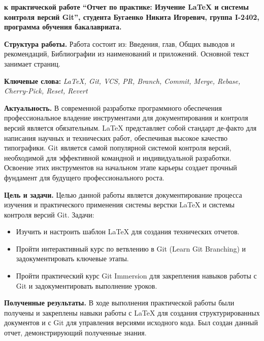 \documentclass[a4paper,12pt]{report}
\newcommand{\uniGroupName}{I-2402}
\newcommand{\authorNameRu}{Бугаенко Никита Игоревич}
\newcommand{\thesisTitleRu}{Отчет по практике: Изучение \LaTeX{} и системы контроля версий Git}
\newcommand{\thesisTypeRu}{практической работе}
\newcommand{\programulDeStudiiRu}{бакалавриата}
\begin{document}
    \titlePage

    \clearpage
    \tableofcontents

    \clearpage

    \textbf{к \thesisTypeRu{} ``\thesisTitleRu{}'', студента \authorNameRu{}, группа \uniGroupName{}, программа обучения \programulDeStudiiRu.}

    \textbf{Структура работы.}
    Работа состоит из: Введения, \chapterCount{} глав, Общих выводов и рекомендаций, Библиографии из \bibliographyEntryCount{} наименований и \anexeCount{} приложений.
    Основной текст занимает \usefulPageCount{} страниц.

    \textbf{Ключевые слова:}
    \textit{\LaTeX{}, Git, \ac{VCS}, \ac{PR}, Branch, Commit, Merge, Rebase, Cherry-Pick, Reset, Revert}

    \textbf{Актуальность.}
    В современной разработке программного обеспечения профессиональное владение инструментами для документирования и контроля версий является обязательным. \LaTeX{} представляет собой стандарт де-факто для написания научных и технических работ,
    обеспечивая высокое качество типографики.
    Git является самой популярной системой контроля версий, необходимой для эффективной командной и индивидуальной разработки.
    Освоение этих инструментов на начальном этапе карьеры создает прочный фундамент для будущего профессионального роста.

    \textbf{Цель и задачи.}
    Целью данной работы является документирование процесса изучения и практического применения системы верстки \LaTeX{} и системы контроля версий Git.
    Задачи:
    \begin{itemize}
        \item Изучить и настроить шаблон \LaTeX{} для создания технических отчетов.
        \item Пройти интерактивный курс по ветвлению в Git (Learn Git Branching) и задокументировать ключевые этапы.
        \item Пройти практический курс Git Immersion для закрепления навыков работы с Git и задокументировать выполнение уроков.
    \end{itemize}

    \textbf{Полученные результаты.}
    В ходе выполнения практической работы были получены и закреплены навыки работы с \LaTeX{} для создания структурированных документов и с Git для управления версиями исходного кода.
    Был создан данный отчет, демонстрирующий полученные знания.
\end{document}
